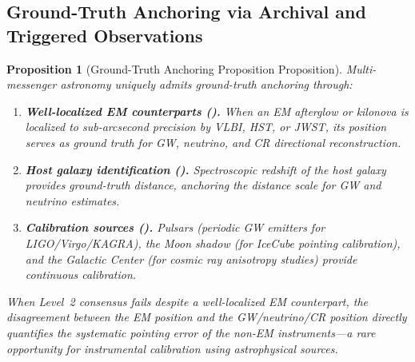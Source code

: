 \documentclass[11pt,a4paper]{article}
\newtheorem{proposition}[theorem]{Proposition}
\theoremstyle{definition}
\begin{document}
\subsection{Ground-Truth Anchoring via Archival and Triggered Observations}
\begin{proposition}[Ground-Truth Anchoring Proposition Proposition]\label{prop:ground_truth}
Multi-messenger astronomy uniquely admits ground-truth anchoring through:
\begin{enumerate}[label=(\roman*)]
    \item \textbf{Well-localized EM counterparts ().} When an EM afterglow or kilonova is localized to sub-arcsecond precision by VLBI, HST, or JWST, its position serves as ground truth for GW, neutrino, and CR directional reconstruction.
    \item \textbf{Host galaxy identification ().} Spectroscopic redshift of the host galaxy provides ground-truth distance, anchoring the distance scale for GW and neutrino estimates.
    \item \textbf{Calibration sources ().} Pulsars (periodic GW emitters for LIGO/Virgo/KAGRA), the Moon shadow (for IceCube pointing calibration), and the Galactic Center (for cosmic ray anisotropy studies) provide continuous calibration.
\end{enumerate}
When Level~2 consensus fails despite a well-localized EM counterpart, the disagreement between the EM position and the GW/neutrino/CR position directly quantifies the systematic pointing error of the non-EM instruments---a rare opportunity for instrumental calibration using astrophysical sources.
\end{proposition}
\end{document}
